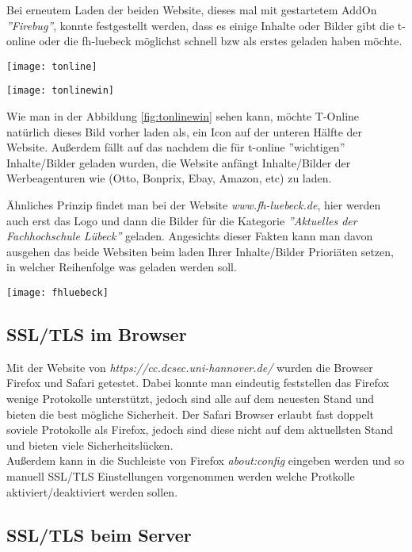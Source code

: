 \documentclass{scrartcl}
\begin{document}
  Bei erneutem Laden der beiden Website, dieses mal mit gestartetem AddOn \textit{''Firebug''}, konnte festgestellt werden, dass es einige Inhalte oder Bilder gibt die t-online oder die fh-luebeck möglichst schnell bzw als erstes geladen haben möchte. 
  
    \texttt{[image: tonline]}
    \label{fig:tonline}
  
    \texttt{[image: tonlinewin]}
    \label{fig:tonlinewin}
  
  Wie man in der Abbildung \ref{fig:tonlinewin} sehen kann, möchte T-Online natürlich dieses Bild vorher laden als, ein Icon auf der unteren Hälfte der Website.
  Außerdem fällt auf das nachdem die für t-online ''wichtigen'' Inhalte/Bilder geladen wurden, die Website anfängt Inhalte/Bilder der Werbeagenturen wie (Otto, Bonprix, Ebay, Amazon, etc) zu laden. 
  
  Ähnliches Prinzip findet man bei der Website \emph{\textit{www.fh-luebeck.de}}, hier werden auch erst das Logo und dann die Bilder für die Kategorie \textit{''Aktuelles der Fachhochschule Lübeck''} geladen. Angesichts dieser Fakten kann man davon ausgehen das beide Websiten beim laden Ihrer Inhalte/Bilder Prioriäten setzen, in welcher Reihenfolge was geladen werden soll.
  
  \texttt{[image: fhluebeck]}
  \label{fig:fhluebeck}
  
  \subsection[Aufgabe 8 SSL/TLS im Browser]{SSL/TLS im Browser}
  
  Mit der Website von \emph{\textit{https://cc.dcsec.uni-hannover.de/}} wurden die Browser Firefox und Safari getestet. 
  Dabei konnte man eindeutig feststellen das Firefox wenige Protokolle unterstützt, jedoch sind alle auf dem neuesten Stand und bieten die best mögliche Sicherheit.
  Der Safari Browser erlaubt fast doppelt soviele Protokolle als Firefox, jedoch sind diese nicht auf dem aktuellsten Stand und bieten viele Sicherheitslücken.\\
  Außerdem kann in die Suchleiste von Firefox \textit{about:config} eingeben werden und so manuell SSL/TLS Einstellungen vorgenommen werden welche Protkolle aktiviert/deaktiviert werden sollen.
  
  \subsection[Aufgabe 9 SSL/TLS beim Server]{SSL/TLS beim Server}
  
\end{document}
